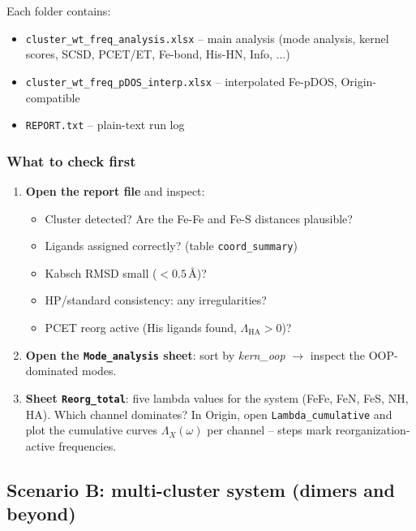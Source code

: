 \documentclass[11pt,a4paper,twoside]{article}
\theoremstyle{remark}
\begin{document}
Each folder contains:

\begin{itemize}
  \item \texttt{cluster\_wt\_freq\_analysis.xlsx} -- main analysis
        (mode analysis, kernel scores, SCSD, PCET/ET, Fe-bond,
        His-HN, Info, ...)
  \item \texttt{cluster\_wt\_freq\_pDOS\_interp.xlsx} -- interpolated
        Fe-pDOS, Origin-compatible
  \item \texttt{REPORT.txt} -- plain-text run log
\end{itemize}

\subsubsection*{What to check first}

\begin{enumerate}
  \item \textbf{Open the report file} and inspect:
    \begin{itemize}
      \item Cluster detected? Are the Fe-Fe and Fe-S distances
            plausible?
      \item Ligands assigned correctly?
            (table \texttt{coord\_summary})
      \item Kabsch RMSD small ($< 0.5$\,\AA{})?
      \item HP/standard consistency: any irregularities?
      \item PCET reorg active (His ligands found,
            $\Lambda_\text{HA} > 0$)?
    \end{itemize}
  \item \textbf{Open the \texttt{Mode\_analysis} sheet}: sort by
        \emph{kern\_oop} $\to$ inspect the OOP-dominated modes.
  \item \textbf{Sheet \texttt{Reorg\_total}}: five lambda values
        for the system (FeFe, FeN, FeS, NH, HA). Which channel
        dominates? In Origin, open \texttt{Lambda\_cumulative}
        and plot the cumulative curves $\Lambda_X(\omega)$ per
        channel -- steps mark reorganization-active frequencies.
\end{enumerate}

\subsection{Scenario B: multi-cluster system (dimers and beyond)}
\label{sec:workflow-multi}
\end{document}
